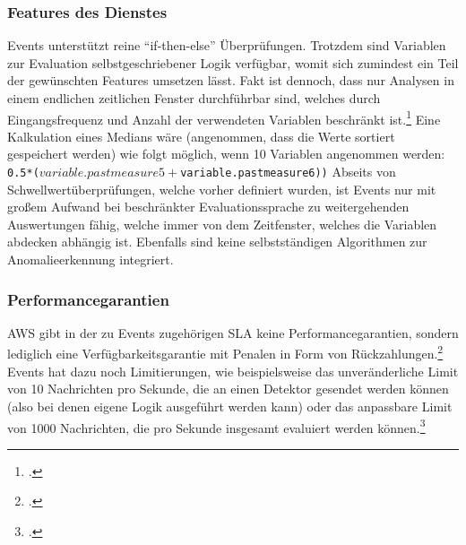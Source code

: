 \subsubsection{Features des Dienstes}
\AWSIOT{} Events unterstützt reine \enquote{if-then-else} Überprüfungen. Trotzdem sind Variablen zur Evaluation selbstgeschriebener Logik verfügbar, womit sich zumindest ein Teil der gewünschten Features umsetzen lässt. Fakt ist dennoch, dass nur Analysen in einem endlichen zeitlichen Fenster durchführbar sind, welches durch Eingangsfrequenz und Anzahl der verwendeten Variablen beschränkt ist.\footcite[Vgl.][]{AmazonWebServicesInc..o.J.am} Eine Kalkulation eines Medians wäre (angenommen, dass die Werte sortiert gespeichert werden) wie folgt möglich, wenn 10 Variablen angenommen werden: \texttt{0.5*($variable.pastmeasure5 + $variable.pastmeasure6))}
Abseits von Schwellwertüberprüfungen, welche vorher definiert wurden, ist \AWSIOT{} Events nur mit großem Aufwand bei beschränkter Evaluationssprache zu weitergehenden Auswertungen fähig, welche immer von dem Zeitfenster, welches die Variablen abdecken abhängig ist. Ebenfalls sind keine selbstständigen Algorithmen zur Anomalieerkennung integriert.

\subsubsection{Performancegarantien}
\ac{AWS} gibt in der zu \AWSIOT{} Events zugehörigen \ac{SLA} keine Performancegarantien, sondern lediglich eine Verfügbarkeitsgarantie mit Penalen in Form von Rückzahlungen.\footcite[Vgl.][]{AmazonWebServicesInc..o.J.an} \AWSIOT{} Events hat dazu noch Limitierungen, wie beispielsweise das unveränderliche Limit von 10 Nachrichten pro Sekunde, die an einen Detektor gesendet werden können (also bei denen eigene Logik ausgeführt werden kann) oder das anpassbare Limit von 1000 Nachrichten, die pro Sekunde insgesamt evaluiert werden können.\footcite[Vgl.][]{AmazonWebServicesInc..o.J.ap}

